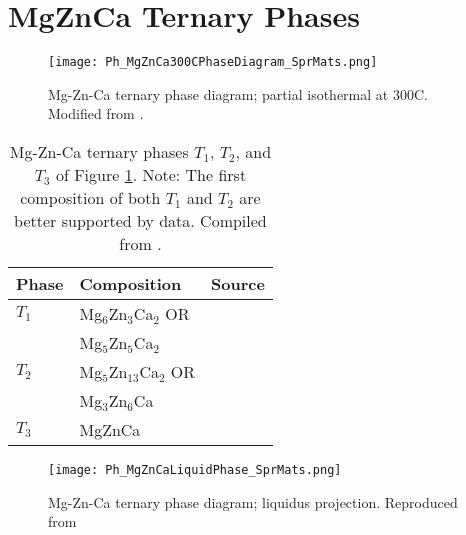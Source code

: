 \documentclass[a4paper,12pt,oneside]{report}%
\begin{document}
\clearpage
\newpage

\section{MgZnCa Ternary Phases}

\begin{figure}[htb]
	\centering
	\texttt{[image: Ph\_MgZnCa300CPhaseDiagram\_SprMats.png]}
	\caption[Mg-Zn-Ca ternary phase diagram; partial isothermal at 300\degree C.]{Mg-Zn-Ca ternary phase diagram; partial isothermal at 300\degree C. Modified from \cite{Melnik1978}.}
	\label{fig:MgZnCa300PhaseD}
\end{figure}

\begin{table}[H]
	\centering
	\begin{tabular}{ l l l }
		\toprule
		Phase & Composition & Source \\
		\midrule
		$T_{1}$ & Mg$_{6}$Zn$_{3}$Ca$_{2}$ OR & \cite{Clark1961} \\
		& Mg$_{5}$Zn$_{5}$Ca$_{2}$ & \\
		$T_{2}$	& Mg$_{5}$Zn$_{13}$Ca$_{2}$ OR & \cite{Clark1961} \\
		& Mg$_{3}$Zn$_{6}$Ca & \\
		$T_{3}$	& MgZnCa & \cite{Schulze1961} \\
		\bottomrule
	\end{tabular}
	\caption[Mg-Zn-Ca ternary phases $T_{1}$, $T_{2}$, and $T_{3}$ of Figure \ref{fig:MgZnCa300PhaseD}. Note: The first composition of both $T_{1}$ and $T_{2}$ are better supported by data.]{Mg-Zn-Ca ternary phases $T_{1}$, $T_{2}$, and $T_{3}$ of Figure \ref{fig:MgZnCa300PhaseD}. Note: The first composition of both $T_{1}$ and $T_{2}$ are better supported by data. Compiled from \cite{Clark1961, Schulze1961}.}
	\label{tab:SputterParameters}
\end{table}

\begin{figure}[htb]
	\centering
	\texttt{[image: Ph\_MgZnCaLiquidPhase\_SprMats.png]}
	\caption[Mg-Zn-Ca ternary phase diagram; liquidus projection.]{Mg-Zn-Ca ternary phase diagram; liquidus projection. Reproduced from \cite{Paris1933}}
	\label{fig:MgZnCaLiquidPhaseD}
\end{figure}
\end{document}
